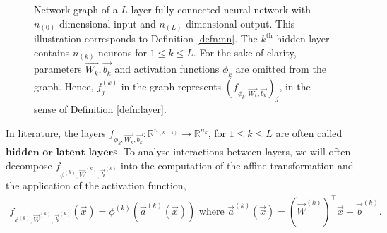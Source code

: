 \begin{figure}[H]
	\caption[Network graph for a $(L+1)$-layer fully-connected neural network.]{Network graph of a $L$-layer fully-connected neural network with $n_{(0)}$-dimensional input and $n_{(L)}$-dimensional output. This illustration corresponds to Definition \ref{defn:nn}. The $k^{\text{th}}$ hidden layer contains $n_{(k)}$ neurons for $1 \leq k \leq L$. For the sake of clarity, parameters $\vec{W_k}, \vec{b_k}$ and activation functions $\phi_k$ are omitted from the graph. Hence, $f_{j}^{(k)}$ in the graph represents $(f_{\phi_k, \vec{W_k}, \vec{b_k}})_j$, in the sense of Definition \ref{defn:layer}.}
	\label{fig:nn}
\end{figure}
In literature, the layers $f_{\phi_k, \vec{W_k}, \vec{b_k}} : \mathbb{R}^{n_{(k-1)}} \to \mathbb{R}^{n_{k}}$, for $1 \leq k \leq L$ are often called $\textbf{hidden or latent layers}$. To analyse interactions between layers, we will often decompose $f_{\phi^{(k)}, \vec{W}^{(k)}, \vec{b}^{(k)}}$ into the computation of the affine transformation and the application of the activation function,  \begin{align*}
    f_{\phi^{(k)}, \vec{W}^{(k)}, \vec{b}^{(k)}} (\vec{x}) = \phi^{(k)} (\vec{a}^{(k)}(\vec{x})) \text{ where } \vec{a}^{(k)} (\vec{x})  = (\vec{W}^{(k)})^{\top}\vec{x} + \vec{b}^{(k)}.
\end{align*}
